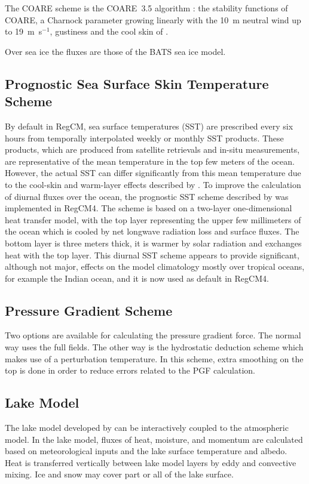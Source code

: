 {The COARE scheme is the COARE~3.5 algorithm \citep{Fairall_03,Edson_13}:
the stability functions of COARE, a Charnock parameter growing linearly
with the 10~m neutral wind up to 19~m~s$^{-1}$, gustiness and the cool skin
of \cite{Fairall_96}.

Over sea ice the fluxes are those of the \ac{BATS} sea ice model.

\subsection{Prognostic Sea Surface Skin Temperature Scheme}

By default in \ac{RegCM}, sea surface temperatures (SST) are prescribed every
six hours from temporally interpolated weekly or monthly SST products.
These products, which are produced from satellite retrievals and in-situ
measurements, are representative of the mean temperature in the top
few meters of the ocean. However, the actual SST can differ significantly
from this mean temperature due to the cool-skin and warm-layer effects
described by \cite{Fairall_96}. To improve the calculation of diurnal fluxes
over the ocean, the prognostic SST scheme described by \cite{Zeng_05} was
implemented in \ac{RegCM4}. The scheme is based on a two-layer
one-dimensional heat transfer model, with the top layer representing the
upper few millimeters of the ocean which is cooled by net longwave radiation
loss and surface fluxes. The bottom layer is three meters thick, it is warmer by
solar radiation and exchanges heat with the top layer. This diurnal SST
scheme appears to provide significant, although not major, effects on the
model climatology mostly over tropical oceans, for example the Indian ocean,
and it is now used as default in \ac{RegCM4}.

\subsection{Pressure Gradient Scheme}

Two options are available for
calculating the pressure gradient force.  The normal way uses the full fields.
The other way is the hydrostatic deduction scheme which makes use of a
perturbation temperature.  In this scheme, extra smoothing on the top is done in
order to reduce errors related to the PGF calculation. 

\subsection{Lake Model}
The lake model developed by \cite{Hostetler_93} can
be interactively coupled to the atmospheric model.  In the lake model, fluxes of
heat, moisture, and momentum are calculated based on meteorological inputs and
the lake surface temperature and albedo.  Heat is transferred vertically between
lake model layers by eddy and convective mixing.  Ice and snow may cover part or
all of the lake surface.

}
